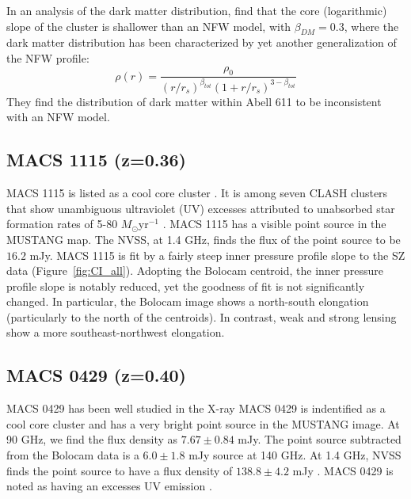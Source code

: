 In an analysis of the dark matter distribution, \citet{newman2009} find that the core (logarithmic) slope of the
cluster is shallower than an NFW model, with $\beta_{DM} = 0.3$, where the dark matter distribution has been characterized
by yet another generalization of the NFW profile:
\begin{equation}
  \rho(r) = \frac{\rho_0}{(r/r_s)^{\beta_{tot}}(1 + r/r_s)^{3-\beta_{tot}}}
\end{equation}
They find the distribution of dark matter within Abell 611 to be inconsistent with an NFW model. 


\subsection{MACS 1115 (z=0.36)}
\label{sec:results_m1115}


MACS 1115 is listed as a cool core cluster \citep{sayers2013}. It is among seven CLASH clusters that show
unambiguous ultraviolet (UV) excesses attributed to unabsorbed star formation rates of 5-80 $M_{\odot} $yr$^{-1}$
\citep{donahue2015}.
MACS 1115 has a visible point source in the MUSTANG map. The NVSS, at 1.4 GHz, finds the flux of the point source
to be $16.2$ mJy.
MACS 1115 is fit by a fairly steep inner pressure profile slope to the SZ data (Figure~\ref{fig:CI_all}).
Adopting the Bolocam centroid, the inner pressure profile slope is notably reduced, yet the goodness of fit is
not significantly changed. In particular, the Bolocam image shows a north-south elongation (particularly to the
north of the centroids). In contrast, weak and strong lensing \citep{zitrin2015} show a more southeast-northwest
elongation.


\subsection{MACS 0429 (z=0.40)}
\label{sec:results_m0429}


MACS 0429 has been well studied in the X-ray \citep{schmidt2007,comerford2007,maughan2008,allen2008,mann2012}
MACS 0429 is indentified as a cool core cluster \citep[cf.][]{mann2012,sayers2013} 
and has a very bright point source in the MUSTANG image.
At 90 GHz, we find the flux density as $7.67 \pm 0.84$ mJy. The point source subtracted from the Bolocam data
is a $6.0 \pm 1.8$ mJy source at 140 GHz. At 1.4 GHz, NVSS finds the point source to have a flux density of
$138.8 \pm 4.2$ mJy \citep{condon1998}. MACS 0429 is noted as having an excesses UV emission \citep{donahue2015}. 

